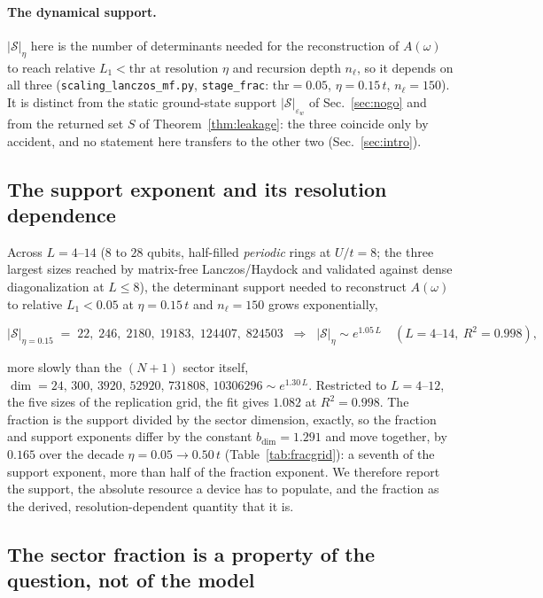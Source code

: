 \paragraph{The dynamical support.} $|\mathcal S|_\eta$ here is the number of
determinants needed for the reconstruction of $A(\omega)$ to reach relative $L_1<\mathrm{thr}$ at
resolution $\eta$ and recursion depth $n_\ell$, so it depends on all three
(\texttt{scaling\_lanczos\_mf.py}, \texttt{stage\_frac}: $\mathrm{thr}=0.05$, $\eta=0.15\,t$,
$n_\ell=150$). It is distinct from the static ground-state support $|\mathcal S|_{\varepsilon_w}$ of
Sec.~\ref{sec:nogo} and from the returned set $S$ of Theorem~\ref{thm:leakage}: the three coincide only
by accident, and no statement here transfers to the other two (Sec.~\ref{sec:intro}).

\subsection{The support exponent and its resolution dependence}

Across $L=4$--$14$ ($8$ to $28$ qubits, half-filled \emph{periodic} rings at $U/t=8$; the three largest
sizes reached by matrix-free Lanczos/Haydock and validated against dense diagonalization at $L\le8$),
the determinant support needed to reconstruct $A(\omega)$ to relative $L_1<0.05$ at $\eta=0.15\,t$ and
$n_\ell=150$ grows exponentially,
\begin{widetext}
\begin{equation}
|\mathcal S|_{\eta=0.15} \;=\; 22,\;246,\;2180,\;19183,\;124407,\;824503
\;\;\Longrightarrow\;\; |\mathcal S|_\eta\sim e^{1.05\,L}\quad(L=4\text{--}14,\ R^{2}=0.998),
\label{eq:supportexp}
\end{equation}
\end{widetext}
more slowly than the $(N{+}1)$ sector itself,
$\dim = 24,\,300,\,3920,\,52920,\,731808,\,10306296\sim e^{1.30\,L}$. Restricted to $L=4$--$12$, the five sizes of the replication grid, the fit gives $1.082$ at
$R^{2}=0.998$. The fraction is the support divided by the sector dimension, exactly, so the fraction and
support exponents differ by the constant $b_{\dim}=1.291$ and move together, by $0.165$ over the decade
$\eta=0.05\to0.50\,t$ (Table~\ref{tab:fracgrid}): a seventh of the support exponent, more than half
of the fraction exponent. We therefore report the support, the absolute resource a device has to populate,
and the fraction as the derived, resolution-dependent quantity that it is.

\subsection{The sector fraction is a property of the question, not of the model}

